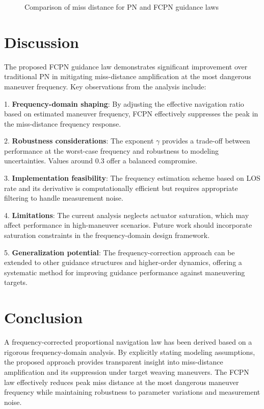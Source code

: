 \documentclass[11pt,a4paper]{article}
\begin{document}
\begin{figure}[h]
\centering
{}
\caption{Comparison of miss distance for PN and FCPN guidance laws}
\label{fig:miss_comparison}
\end{figure}

\section{Discussion}
The proposed FCPN guidance law demonstrates significant improvement over traditional PN in mitigating miss-distance amplification at the most dangerous maneuver frequency. Key observations from the analysis include:

1. \textbf{Frequency-domain shaping}: By adjusting the effective navigation ratio based on estimated maneuver frequency, FCPN effectively suppresses the peak in the miss-distance frequency response.

2. \textbf{Robustness considerations}: The exponent $\gamma$ provides a trade-off between performance at the worst-case frequency and robustness to modeling uncertainties. Values around 0.3 offer a balanced compromise.

3. \textbf{Implementation feasibility}: The frequency estimation scheme based on LOS rate and its derivative is computationally efficient but requires appropriate filtering to handle measurement noise.

4. \textbf{Limitations}: The current analysis neglects actuator saturation, which may affect performance in high-maneuver scenarios. Future work should incorporate saturation constraints in the frequency-domain design framework.

5. \textbf{Generalization potential}: The frequency-correction approach can be extended to other guidance structures and higher-order dynamics, offering a systematic method for improving guidance performance against maneuvering targets.

\section{Conclusion}
A frequency-corrected proportional navigation law has been derived based on a rigorous frequency-domain analysis. By explicitly stating modeling assumptions, the proposed approach provides transparent insight into miss-distance amplification and its suppression under target weaving maneuvers. The FCPN law effectively reduces peak miss distance at the most dangerous maneuver frequency while maintaining robustness to parameter variations and measurement noise.
\end{document}
